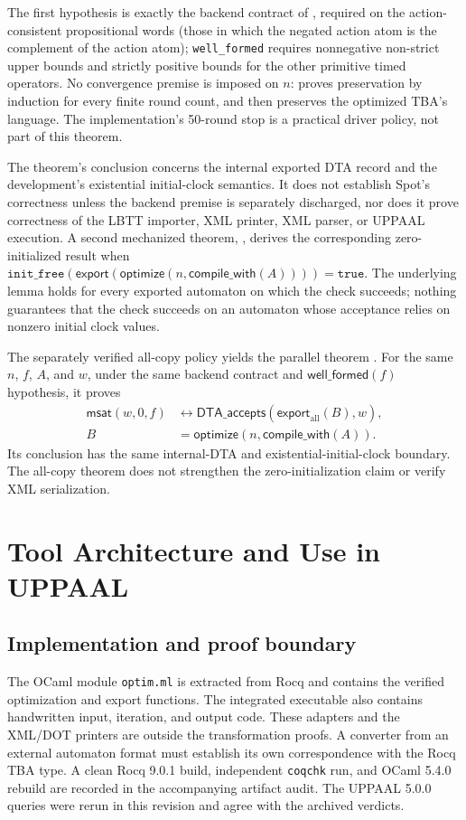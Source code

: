 \documentclass{ieeeaccess}
\providecommand{\optimize}{\mathsf{optimize}}
\providecommand{\export}{\mathsf{export}}
\begin{document}
The first hypothesis is exactly the backend contract of
, required on the action-consistent
propositional words (those in which the negated action atom is the complement
of the action atom); \texttt{well\_formed} requires
nonnegative non-strict upper bounds and strictly positive bounds for the
other primitive timed operators. No convergence premise is imposed on
$n$:  proves preservation by induction for every
finite round count, and  then preserves the optimized
TBA's language. The implementation's 50-round stop is a practical driver
policy, not part of this theorem.

The theorem's conclusion concerns the internal exported DTA record and the
development's existential initial-clock semantics. It does not establish
Spot's correctness unless the backend premise is separately discharged, nor
does it prove correctness of the LBTT importer, XML printer, XML parser, or
UPPAAL execution. A second mechanized theorem,
, derives the corresponding
zero-initialized result when
$\texttt{init\_free}(\export(\optimize(n,\mathsf{compile\_with}(A))))=\texttt{true}$.
The underlying lemma  holds for every exported
automaton on which the check succeeds; nothing guarantees that the check
succeeds on an automaton whose acceptance relies on nonzero initial clock values.

The separately verified all-copy policy yields the parallel theorem
. For the same $n$, $f$,
$A$, and $w$, under the same backend contract and
$\mathsf{well\_formed}(f)$ hypothesis, it proves
\[
\begin{aligned}
\mathsf{msat}(w,0,f)
&\leftrightarrow
\mathsf{DTA\_accepts}(\export_{\mathrm{all}}(B),w),\\
B&=\optimize(n,\mathsf{compile\_with}(A)).
\end{aligned}
\]
Its conclusion has the same internal-DTA and existential-initial-clock
boundary. The all-copy theorem does not strengthen the zero-initialization
claim or verify XML serialization.

\section{Tool Architecture and Use in UPPAAL}
\label{sec:toolchain}
\subsection{Implementation and proof boundary}
The OCaml module \texttt{optim.ml} is extracted from Rocq and contains the
verified optimization and export functions. The integrated executable also
contains handwritten input, iteration, and output code. These adapters and
the XML/DOT printers are outside the transformation proofs. A converter from
an external automaton format must establish its own correspondence with the
Rocq TBA type. A clean Rocq 9.0.1 build, independent \texttt{coqchk} run,
and OCaml 5.4.0 rebuild are recorded in the accompanying artifact audit.
The UPPAAL 5.0.0 queries were rerun in this revision and agree with the
archived verdicts.
\end{document}
